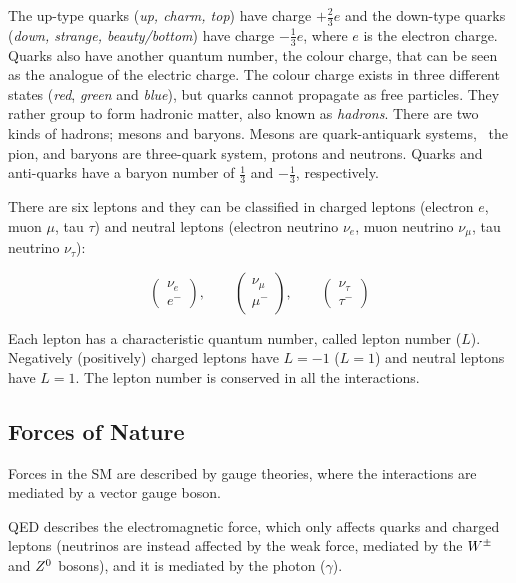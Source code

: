 			\noindent The up-type quarks (\textit{up, charm, top}) have charge $+\frac{2}{3}e$ and the down-type quarks (\textit{down, strange, beauty/bottom}) have charge $-\frac{1}{3}e$, where $e$ is the electron charge. Quarks also have another quantum number, the colour charge, that can be seen as the analogue of the electric charge. The colour charge exists in three different states (\textit{red}, \textit{green} and \textit{blue}), but quarks cannot propagate as free particles. They rather group to form hadronic matter, also known as \emph{hadrons}. There are two kinds of hadrons; mesons and baryons. Mesons are quark-antiquark systems, \eg\ the pion, and baryons are three-quark system, \eg protons and neutrons. Quarks and anti-quarks have a baryon number of $\frac{1}{3}$ and $-\frac{1}{3}$, respectively.

			There are six leptons and they can be classified in charged leptons (electron $e$, muon $\mu$, tau $\tau$) and neutral leptons (electron neutrino $\nu_e$, muon neutrino $\nu_{\mu}$, tau neutrino $\nu_{\tau}$):
			
			\begin{equation*}
			\label{eq:lepton_flavor_doublets}
				\begin{pmatrix} \nu_e      \\ e^-    \end{pmatrix}, \qquad
				\begin{pmatrix} \nu_{\mu}  \\ \mu^-  \end{pmatrix}, \qquad
				\begin{pmatrix} \nu_{\tau} \\ \tau^- \end{pmatrix}
			\end{equation*}

			\noindent Each lepton has a characteristic quantum number, called lepton number ($L$). Negatively (positively) charged leptons have $L=-1$ ($L=1$) and neutral leptons have $L=1$. The lepton number is conserved in all the interactions. 



		\subsection*{Forces of Nature}

			Forces in the \ac{SM} are described by gauge theories, where the interactions are mediated by a vector gauge boson. 

			\ac{QED} describes the electromagnetic force, which only affects quarks and charged leptons (neutrinos are instead affected by the weak force, mediated by the $W^{\pm}$ and $Z^0$ bosons), and it is mediated by the photon ($\gamma$).

